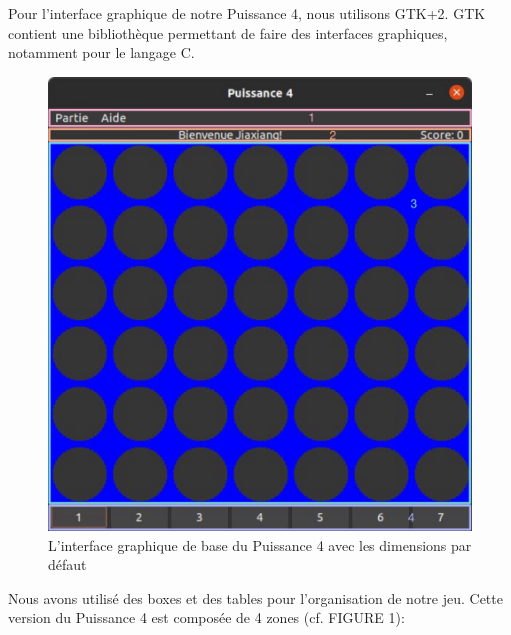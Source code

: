 \documentclass[a4paper, 11pt, oneside]{article}
\begin{document}
Pour l'interface graphique de notre Puissance 4, nous utilisons GTK+2. GTK contient une bibliothèque permettant de faire des interfaces graphiques, notamment pour le langage C. 

\begin{figure}[h]
    \center
    \includegraphics[scale = 0.15]{image1.jpg}
    \caption{L'interface graphique de base du Puissance 4 avec les dimensions par défaut}
\end{figure}


Nous avons utilisé des boxes et des tables pour l'organisation de notre jeu. Cette version du Puissance 4 est composée de 4 zones (cf. FIGURE 1): \\
\end{document}
